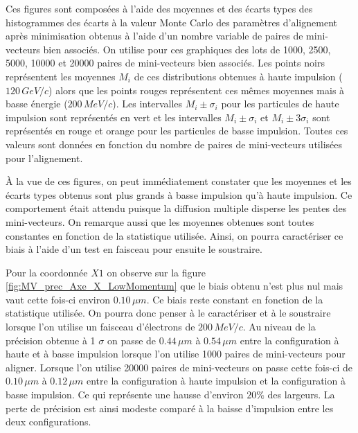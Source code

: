   Ces figures sont compos\'ees \`a l'aide des moyennes et des \'ecarts types des histogrammes des \'ecarts \`a la valeur Monte Carlo des param\`etres d'alignement apr\`es minimisation obtenus \`a l'aide d'un nombre variable de paires de mini-vecteurs bien associ\'es. On utilise pour ces graphiques des lots de 1000, 2500, 5000, 10000 et 20000 paires de mini-vecteurs bien associ\'es. Les points noirs repr\'esentent les moyennes $M_i$ de ces distributions obtenues \`a haute impulsion ($120 \, GeV/c$) alors que les points rouges repr\'esentent ces m\^emes moyennes mais \`a basse \'energie ($200 \, MeV/c$). Les intervalles $M_i \pm \sigma_i$ pour les particules de haute impulsion sont repr\'esentés en vert et les intervalles $M_i \pm \sigma_i$ et $M_i \pm 3 \sigma_i$ sont repr\'esent\'es en rouge et orange pour les particules de basse impulsion. Toutes ces valeurs sont données en fonction du nombre de paires de mini-vecteurs utilis\'ees pour l'alignement.

  \medskip
  
  \`A la vue de ces figures, on peut imm\'ediatement constater que les moyennes et les \'ecarts types obtenus sont plus grands \`a basse impulsion qu'à haute impulsion. Ce comportement \'etait attendu puisque la diffusion multiple disperse les pentes des mini-vecteurs. On remarque aussi que les moyennes obtenues sont toutes constantes en fonction de la statistique utilis\'ee. Ainsi, on pourra caract\'eriser ce biais \`a l'aide d'un test en faisceau pour ensuite le soustraire.
   
  \medskip
  
  Pour la coordonn\'ee $X1$ on observe sur la figure \ref{fig:MV_prec_Axe_X_LowMomentum} que le biais obtenu n'est plus nul mais vaut cette fois-ci environ $0.10 \, \mu m$. Ce biais reste constant en fonction de la statistique utilis\'ee. On pourra donc penser \`a le caract\'eriser et \`a le soustraire lorsque l'on utilise un faisceau d'\'electrons de $200 \, MeV/c$. Au niveau de la pr\'ecision obtenue \`a 1 $\sigma$ on passe de $0.44 \, \mu m$ \`a $0.54 \, \mu m$ entre la configuration \`a haute et \`a basse impulsion lorsque l'on utilise 1000 paires de mini-vecteurs pour aligner. Lorsque l'on utilise 20000 paires de mini-vecteurs on passe cette fois-ci de $0.10 \, \mu m$ \`a $0.12 \, \mu m$ entre la configuration \`a haute impulsion et la configuration \`a basse impulsion. Ce qui repr\'esente une hausse d'environ $20\%$ des largeurs. La perte de pr\'ecision est ainsi modeste compar\'e \`a la baisse d'impulsion entre les deux configurations.
  
